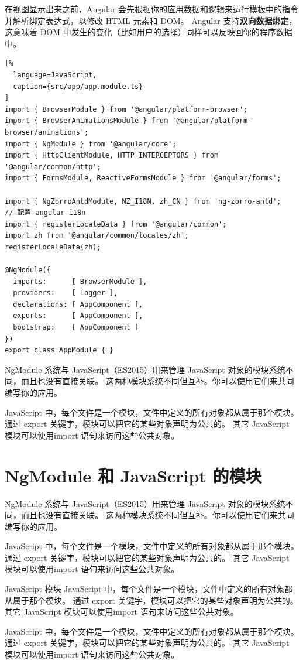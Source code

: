 \documentclass{progbookcn}
\begin{document}
在视图显示出来之前，Angular 会先根据你的应用数据和逻辑来运行模板中的指令并解析绑定表达式，以修改 HTML 元素和 DOM。 Angular 支持\textbf{双向数据绑定}，这意味着 DOM 中发生的变化（比如用户的选择）同样可以反映回你的程序数据中。

\begin{lstlisting}[%
  language=JavaScript,
  caption={src/app/app.module.ts}
]
import { BrowserModule } from '@angular/platform-browser';
import { BrowserAnimationsModule } from '@angular/platform-browser/animations';
import { NgModule } from '@angular/core';
import { HttpClientModule, HTTP_INTERCEPTORS } from '@angular/common/http';
import { FormsModule, ReactiveFormsModule } from '@angular/forms';

import { NgZorroAntdModule, NZ_I18N, zh_CN } from 'ng-zorro-antd';
// 配置 angular i18n
import { registerLocaleData } from '@angular/common';
import zh from '@angular/common/locales/zh';
registerLocaleData(zh);

@NgModule({
  imports:      [ BrowserModule ],
  providers:    [ Logger ],
  declarations: [ AppComponent ],
  exports:      [ AppComponent ],
  bootstrap:    [ AppComponent ]
})
export class AppModule { }
\end{lstlisting}

NgModule 系统与 JavaScript（ES2015）用来管理 JavaScript 对象的模块系统不同，而且也没有直接关联。 这两种模块系统不同但互补。你可以使用它们来共同编写你的应用。

JavaScript 中，每个文件是一个模块，文件中定义的所有对象都从属于那个模块。 通过 export 关键字，模块可以把它的某些对象声明为公共的。 其它 JavaScript 模块可以使用import 语句来访问这些公共对象。


\clearpage

\section{NgModule 和 JavaScript 的模块}

NgModule 系统与 JavaScript（ES2015）用来管理 JavaScript 对象的模块系统不同，而且也没有直接关联。 这两种模块系统不同但互补。你可以使用它们来共同编写你的应用。

JavaScript 中，每个文件是一个模块，文件中定义的所有对象都从属于那个模块。 通过 export 关键字，模块可以把它的某些对象声明为公共的。 其它 JavaScript 模块可以使用import 语句来访问这些公共对象。


\begin{titledbox}{JavaScript 模块}
  JavaScript 中，每个文件是一个模块，文件中定义的所有对象都从属于那个模块。 通过 export 关键字，模块可以把它的某些对象声明为公共的。 其它 JavaScript 模块可以使用import 语句来访问这些公共对象。
  
  JavaScript 中，每个文件是一个模块，文件中定义的所有对象都从属于那个模块。 通过 export 关键字，模块可以把它的某些对象声明为公共的。 其它 JavaScript 模块可以使用import 语句来访问这些公共对象。
\end{titledbox}
\end{document}
